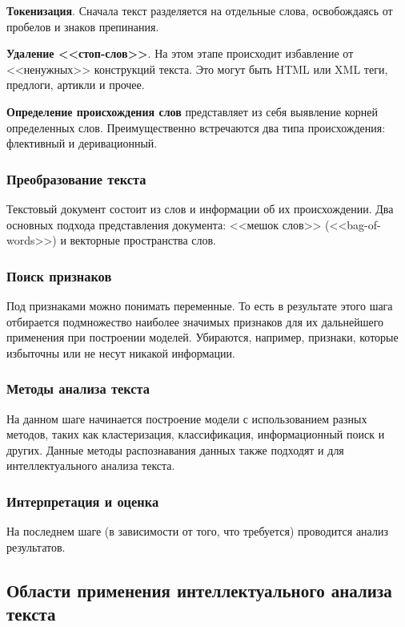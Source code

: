 \documentclass[14pt]{matmex-diploma-custom}
\begin{document}
\textbf{Токенизация}. Сначала текст разделяется на отдельные слова, освобождаясь от пробелов и знаков препинания.

\textbf{Удаление <<стоп-слов>>}. На этом этапе происходит избавление от <<ненужных>> конструкций текста. Это могут быть HTML или XML теги, предлоги, артикли и прочее.

\textbf{Определение происхождения слов} представляет из себя выявление корней определенных слов. Преимущественно встречаются два типа происхождения: флективный и деривационный.

\subsubsection{Преобразование текста}

Текстовый документ состоит из слов и информации об их происхождении. Два основных подхода представления документа: <<мешок слов>> (<<bag-of-words>>) и векторные пространства слов.

\subsubsection{Поиск признаков}

Под признаками можно понимать переменные. То есть в результате этого шага отбирается подмножество наиболее значимых признаков для их дальнейшего применения при построении моделей. Убираются, например, признаки, которые избыточны или не несут никакой информации.

\subsubsection{Методы анализа текста}

На данном шаге начинается построение модели с использованием разных методов, таких как кластеризация, классификация, информационный поиск и других. Данные методы распознавания данных также подходят и для интеллектуального анализа текста.

\subsubsection{Интерпретация и оценка}

На последнем шаге (в зависимости от того, что требуется) проводится анализ результатов.

\subsection{Области применения интеллектуального анализа текста}
\end{document}
